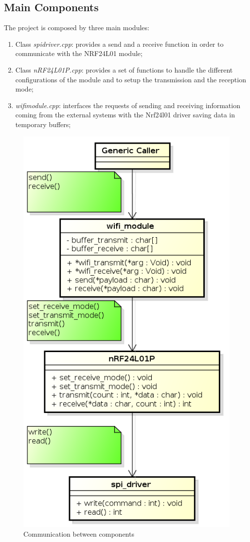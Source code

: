 \documentclass[11pt,a4paper,oneside]{article}
\begin{document}
\subsection{Main Components}
The project is composed by three main modules:
\begin{enumerate}
\item Class {\itshape spi\textunderscore driver.cpp}: provides a send and a receive function in order to communicate with the NRF24L01 module;
\item Class {\itshape nRF24L01P.cpp}: provides a set of functions to handle the different configurations of the module and to setup the transmission and the reception mode;
\item {\itshape wifi\textunderscore module.cpp}: interfaces the requests of sending and receiving information coming from the external systems with the Nrf24l01 driver saving  data in temporary buffers;
\end{enumerate}
\begin{figure}[H]
\centering
\includegraphics[scale=0.4]{./Immagini/generalSchema.png}
\caption{Communication between components}
\label{Communication between components}
\end{figure}
\end{document}
